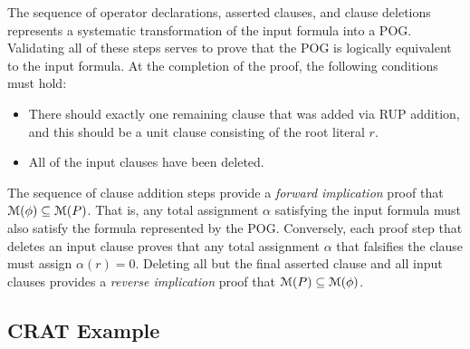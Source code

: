 \documentclass[letterpaper,USenglish,cleveref, autoref, thm-restate]{lipics-v2021}
\newcommand{\assign}{\alpha}
\newcommand{\modelset}{{\cal M}}
\begin{document}

The sequence of operator declarations, asserted clauses, and
clause deletions represents a systematic transformation of the input formula
into a POG\@.  Validating all of these steps serves to prove that the
POG is logically equivalent to the input formula.
At the completion of the proof, the following conditions must hold:
\begin{itemize}
\item There should exactly one remaining clause that was added via RUP
  addition, and this should be a unit clause consisting of the root literal $r$.
\item All of the input clauses have been deleted.
\end{itemize}
The sequence of clause addition steps provide a {\em forward implication} proof that
$\modelset(\phi) \subseteq \modelset(P)$.  That is, any total
assignment $\assign$ satisfying the input formula must also satisfy
the formula represented by the POG\@.
Conversely,
each proof step that deletes an input clause proves that any
total assignment $\alpha$ that falsifies the clause must
assign $\assign(r) = 0$.  Deleting all but the final asserted clause and all input clauses provides a {\em reverse implication} proof
that
$\modelset(P) \subseteq \modelset(\phi)$.

\subsection{CRAT Example}
\end{document}
